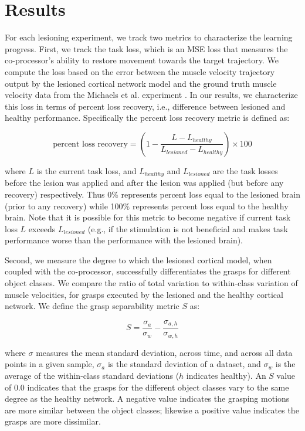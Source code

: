 \documentclass[12pt]{iopart}
\begin{document}
\section{Results}
\label{sec:results}

For each lesioning experiment, we track two metrics to characterize the learning progress. First, we
track the task loss, which is an MSE loss that measures the co-processor's ability to restore
movement towards the target trajectory. We compute the loss based on the error between the muscle
velocity trajectory output by the lesioned cortical network model and the ground truth muscle velocity
data from the Michaels et al. experiment \cite{michaels.mrnn}. In our results, we characterize this loss
in terms of percent loss recovery, i.e., difference between lesioned and healthy performance.
Specifically the percent loss recovery metric is defined as:

\begin{equation}
  \mbox{percent loss recovery} = (1 - \frac{L - L_{healthy}}{L_{lesioned} - L_{healthy}}) \times 100 
\end{equation}

\noindent where $L$ is the current task loss, and $L_{healthy}$ and $L_{lesioned}$ are the task losses before the
lesion was applied and after the lesion was applied (but before any recovery) respectively. Thus 0\% represents
percent loss equal to the lesioned brain (prior to any recovery) while 100\% represents percent loss equal to the
healthy brain. Note that it is possible for this metric to  become negative if current task loss $L$ exceeds
$L_{lesioned}$ (e.g., if the stimulation is not beneficial and makes task performance worse than the
performance with the lesioned brain).

Second, we measure the degree to which the lesioned cortical model, when coupled with the
co-processor, successfully differentiates the grasps for different object classes. We compare the ratio of
total variation to within-class variation of muscle velocities, for grasps executed by the lesioned and
the healthy cortical network. We define the grasp separability metric $S$ as:

\begin{equation}
	S = \frac{\sigma_{a}}{\sigma_{w}} - \frac{\sigma_{a,h}}{\sigma_{w,h}}
\end{equation}

\noindent where $\sigma$ measures the mean standard deviation, across time, and across all data points in
a given sample, $\sigma_{a}$ is the standard deviation of a dataset, and $\sigma_{w}$
is the average of the within-class standard deviations ($h$ indicates healthy). An $S$ value of 0.0
indicates that the grasps for the different object classes vary to the same degree as the healthy network.
A negative value indicates the grasping motions are more similar between the object classes; likewise a
positive value indicates the grasps are more dissimilar.
\end{document}
